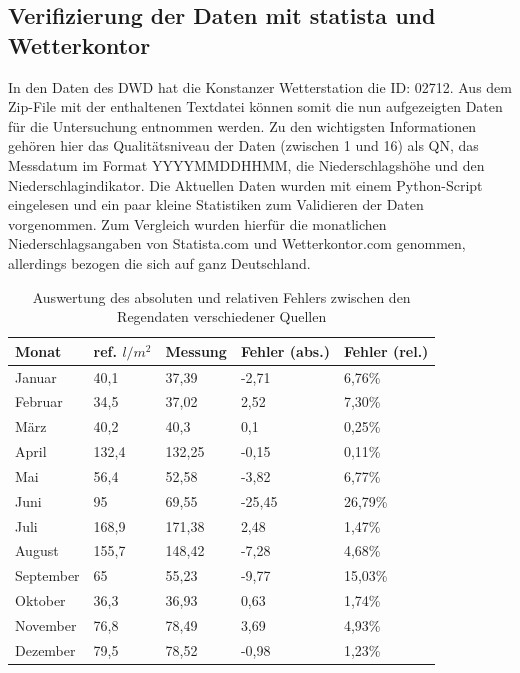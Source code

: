 \subsection{Verifizierung der Daten mit statista und Wetterkontor}
In den Daten des DWD hat die Konstanzer Wetterstation die ID: 02712. Aus dem Zip-File mit der enthaltenen Textdatei können somit die nun aufgezeigten Daten für die Untersuchung entnommen werden. Zu den wichtigsten Informationen gehören hier das Qualitätsniveau der Daten (zwischen 1 und 16) als QN, das Messdatum im Format YYYYMMDDHHMM, die Niederschlagshöhe und den Niederschlagindikator. Die Aktuellen Daten wurden mit einem Python-Script eingelesen und ein paar kleine Statistiken zum Validieren der Daten vorgenommen. Zum Vergleich wurden hierfür die monatlichen Niederschlagsangaben von Statista.com und Wetterkontor.com genommen, allerdings bezogen die sich auf ganz Deutschland.
\begin{table}[ht]
\centering
\begin{tabular}{ll|l|ll}
\textbf{Monat} & \textbf{ref. $l/m^2$} & \textbf{Messung} & \textbf{Fehler (abs.)} & \textbf{Fehler (rel.)}\\\hline
Januar    & 40,1  & 37,39  & -2,71  & 6,76\%\\
Februar   & 34,5  & 37,02  & 2,52   & 7,30\%\\
März      & 40,2  & 40,3   & 0,1    & 0,25\%\\
April     & 132,4 & 132,25 & -0,15  & 0,11\%\\
Mai       & 56,4  & 52,58  & -3,82  & 6,77\%\\
Juni      & 95    & 69,55  & -25,45 & 26,79\%\\
Juli      & 168,9 & 171,38 & 2,48   & 1,47\%\\
August    & 155,7 & 148,42 & -7,28  & 4,68\%\\
September & 65    & 55,23  & -9,77  & 15,03\%\\
Oktober   & 36,3  & 36,93  & 0,63   & 1,74\%\\
November  & 76,8  & 78,49  & 3,69   & 4,93\%\\
Dezember  & 79,5  & 78,52  & -0,98  & 1,23\%\\
\end{tabular}
\caption{Auswertung des absoluten und relativen Fehlers zwischen den Regendaten verschiedener Quellen}
\label{tab:Auswertung}
\end{table}

